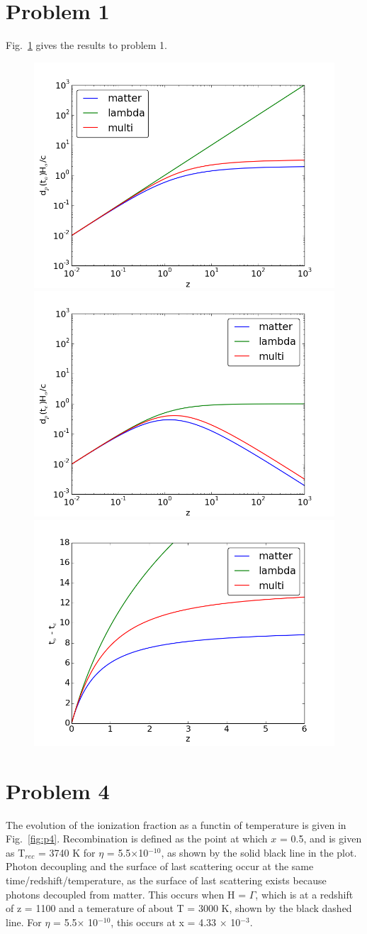 \documentclass[12pt]{article}%
\begin{document}
\section{Problem 1}

Fig.~\ref{fig:p1} gives the results to problem 1.

\begin{figure}[tb]
\center
\includegraphics[width=0.45\linewidth]{dp_to}
\includegraphics[width=0.45\linewidth]{dp_te}
\vspace{0.1cm}
\includegraphics[width=0.45\linewidth]{to-te}
\caption{}
\label{fig:p1}
\end{figure}

\section{Problem 4}

The evolution of the ionization fraction as a functin of temperature is given in Fig.~\ref{fig:p4}. Recombination is defined as the point at which $x$ = 0.5, and is given as T$_{rec}$ = 3740 K for $\eta$ = 5.5$\times$10$^{-10}$, as shown by the solid black line in the plot. Photon decoupling and the surface of last scattering occur at the same time/redshift/temperature, as the surface of last scattering exists because photons decoupled from matter. This occurs when H = $\Gamma$, which is at a redshift of z = 1100 and a temerature of about T = 3000 K, shown by the black dashed line. For $\eta$ = 5.5$\times$ 10$^{-10}$, this occurs at x = 4.33 $\times$ 10$^{-3}$.
\end{document}
